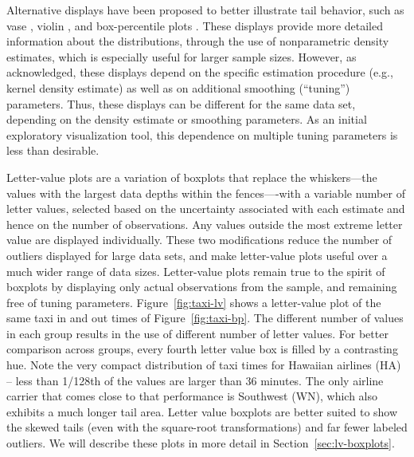 \documentclass[12pt,oneside]{article}
\begin{document}

Alternative displays have been proposed to better illustrate tail behavior,
such as vase \citep{vase}, violin \citep{violin}, and box-percentile plots
\citep{box.percentiles}. These displays provide more detailed information
about the distributions, through the use of nonparametric density estimates,
which is especially useful for larger sample sizes. However, as \citet{vase}
acknowledged, these displays depend on the specific estimation procedure
(e.g., kernel density estimate) as well as on additional smoothing
(``tuning'') parameters. Thus, these displays can be different for the same
data set, depending on the density estimate or smoothing parameters. As an
initial exploratory visualization tool, this dependence on multiple tuning
parameters is less than desirable.

Letter-value plots are a variation of boxplots that replace the whiskers---the values with the largest data depths within the fences----with
a variable number of letter values, selected based on the uncertainty
associated with each estimate and hence on the number of observations. Any
values outside the most extreme letter value are displayed individually. These
two modifications reduce the number of outliers displayed for large data
sets, and make letter-value plots useful over a much wider range of data
sizes. Letter-value plots remain true to the spirit of boxplots by displaying
only actual observations from the sample, and remaining free of tuning
parameters. Figure~\ref{fig:taxi-lv} shows  a
letter-value plot of the same taxi in and out times of Figure~\ref{fig:taxi-bp}. The different number of values in each group results in the use of different number of letter values. For better comparison across groups, every fourth letter value box is filled by a contrasting hue. Note the very compact distribution of taxi times for Hawaiian airlines (HA) -- less than 1/128th of the values are larger than 36 minutes. The only airline carrier that comes close to that performance is Southwest (WN), which also exhibits a much longer tail area.
Letter value boxplots are better suited to show the  skewed tails (even with the
square-root transformations) and far fewer labeled outliers. We will describe these plots in more detail in Section~\ref{sec:lv-boxplots}. 
\end{document}

